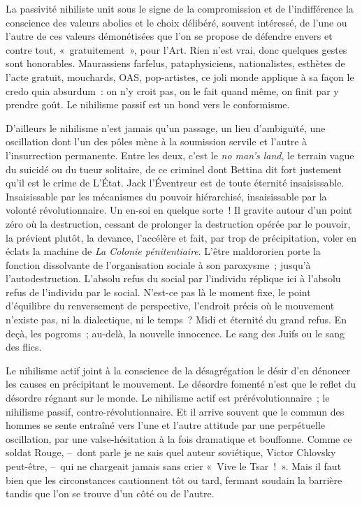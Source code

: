 \documentclass[french,twoside]{book} %
\newcommand{\astermono}{\medskip\centerline{\color{rubric}\large\selectfont{\syms ✻}}\medskip\par}%
\begin{document}
\astermono

\noindent La passivité nihiliste unit sous le signe de la compromission et de l’indifférence la conscience des valeurs abolies et le choix délibéré, souvent intéressé, de l’une ou l’autre de ces valeurs démonétisées que l’on se propose de défendre envers et contre tout, « gratuitement », pour l’Art. Rien n’est vrai, donc quelques gestes sont honorables. Maurassiens farfelus, pataphysiciens, nationalistes, esthètes de l’acte gratuit, mouchards, OAS, pop-artistes, ce joli monde applique à sa façon le credo quia absurdum : on n’y croit pas, on le fait quand même, on finit par y prendre goût. Le nihilisme passif est un bond vers le conformisme.\par
D’ailleurs le nihilisme n’est jamais qu’un passage, un lieu d’ambiguïté, une oscillation dont l’un des pôles mène à la soumission servile et l’autre à l’insurrection permanente. Entre les deux, c’est le \emph{no man’s land}, le terrain vague du suicidé ou du tueur solitaire, de ce criminel dont Bettina dit fort justement qu’il est le crime de L’État. Jack l’Éventreur est de toute éternité insaisissable. Insaisissable par les mécanismes du pouvoir hiérarchisé, insaisissable par la volonté révolutionnaire. Un en-soi en quelque sorte ! Il gravite autour d’un point zéro où la destruction, cessant de prolonger la destruction opérée par le pouvoir, la prévient plutôt, la devance, l’accélère et fait, par trop de précipitation, voler en éclats la machine de \emph{La Colonie pénitentiaire}. L’être maldororien porte la fonction dissolvante de l’organisation sociale à son paroxysme ; jusqu’à l’autodestruction. L’absolu refus du social par l’individu réplique ici à l’absolu refus de l’individu par le social. N’est-ce pas là le moment fixe, le point d’équilibre du renversement de perspective, l’endroit précis où le mouvement n’existe pas, ni la dialectique, ni le temps ? Midi et éternité du grand refus. En deçà, les pogroms ; au-delà, la nouvelle innocence. Le sang des Juifs ou le sang des flics.\par

\astermono

\noindent Le nihilisme actif joint à la conscience de la désagrégation le désir d’en dénoncer les causes en précipitant le mouvement. Le désordre fomenté n’est que le reflet du désordre régnant sur le monde. Le nihilisme actif est prérévolutionnaire ; le nihilisme passif, contre-révolutionnaire. Et il arrive souvent que le commun des hommes se sente entraîné vers l’une et l’autre attitude par une perpétuelle oscillation, par une valse-hésitation à la fois dramatique et bouffonne. Comme ce soldat Rouge, – dont parle je ne sais quel auteur soviétique, Victor Chlovsky peut-être, – qui ne chargeait jamais sans crier « Vive le Tsar ! ». Mais il faut bien que les circonstances cautionnent tôt ou tard, fermant soudain la barrière tandis que l’on se trouve d’un côté ou de l’autre.\par
\end{document}
